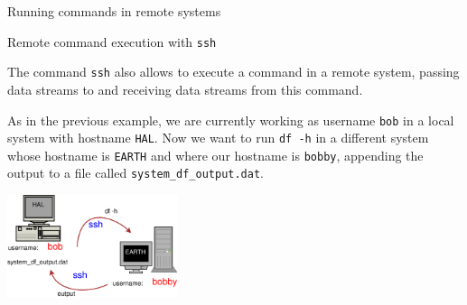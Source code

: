 \begin{frame}[t,fragile]{Running commands in remote systems}
  \begin{block}{Remote command execution with \alert{\texttt{ssh}}}
    {\footnotesize
The command \alert{\texttt{ssh}} also allows to execute a command in a remote system, passing data streams to and receiving data streams from this command. 

As in the previous example, we are currently working as username \texttt{bob} in a local system with hostname \texttt{HAL}. Now we want to run \texttt{df -h} in a different system whose hostname is \texttt{EARTH} and where our hostname is \texttt{bobby}, appending the output to a file called \texttt{system\_df\_output.dat}. 

      \begin{center}
        \includegraphics[angle=0,width=5cm]{./Figs/Diagram6.eps}%
      \end{center}
    }
  \end{block}
  
\end{frame}
